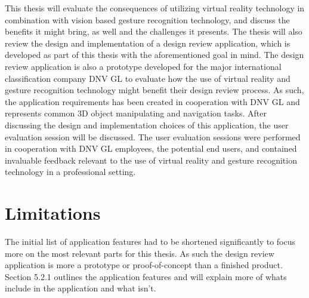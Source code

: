 This thesis will evaluate the consequences of utilizing virtual reality technology in combination with vision based gesture recognition technology, and discuss the benefits it 
might bring, as well and the challenges it presents. 
The thesis will also review the design and implementation of a design review application, which is developed as part of this thesis with the aforementioned goal in mind. 
The design review application is also a prototype developed for the major international classification company DNV GL to evaluate how the use of virtual reality and gesture
recognition technology might benefit their design review process. As such, the application requirements has been created in cooperation with DNV GL and represents
common 3D object manipulating and navigation tasks. After discussing the design and implementation choices of this application, the user evaluation session will be discussed. 
The user evaluation sessions were performed in cooperation with DNV GL employees, the potential end users, and contained invaluable feedback relevant to the use of virtual reality and gesture
recognition technology in a professional setting. 

\section{Limitations}
The initial list of application features had to be shortened significantly to focus more on the most relevant parts for this thesis. As such the design review application
is more a prototype or proof-of-concept than a finished product. Section 5.2.1 outlines the application features and will explain more of whats include in the application and what isn't. 

